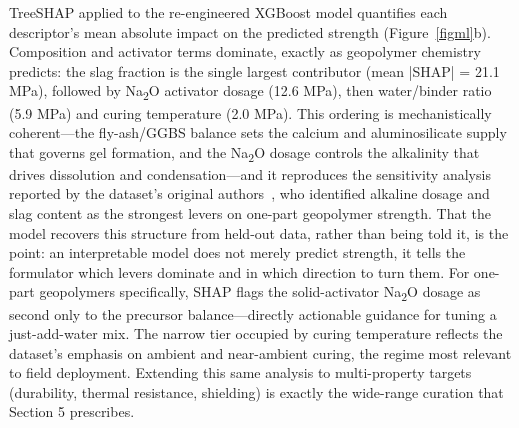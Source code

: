 \documentclass[materials,article,submit,pdftex,moreauthors]{Definitions/mdpi}
\begin{document}
TreeSHAP applied to the re-engineered XGBoost model quantifies each descriptor's mean absolute impact on the predicted strength (Figure~\ref{figml}b). Composition and activator terms dominate, exactly as geopolymer chemistry predicts: the slag fraction is the single largest contributor (mean |SHAP| = 21.1 MPa), followed by Na\textsubscript{2}O activator dosage (12.6 MPa), then water/binder ratio (5.9 MPa) and curing temperature (2.0 MPa). This ordering is mechanistically coherent---the fly-ash/GGBS balance sets the calcium and aluminosilicate supply that governs gel formation, and the Na\textsubscript{2}O dosage controls the alkalinity that drives dissolution and condensation---and it reproduces the sensitivity analysis reported by the dataset's original authors~\cite{ref27}, who identified alkaline dosage and slag content as the strongest levers on one-part geopolymer strength. That the model recovers this structure from held-out data, rather than being told it, is the point: an interpretable model does not merely predict strength, it tells the formulator which levers dominate and in which direction to turn them. For one-part geopolymers specifically, SHAP flags the solid-activator Na\textsubscript{2}O dosage as second only to the precursor balance---directly actionable guidance for tuning a just-add-water mix. The narrow tier occupied by curing temperature reflects the dataset's emphasis on ambient and near-ambient curing, the regime most relevant to field deployment. Extending this same analysis to multi-property targets (durability, thermal resistance, shielding) is exactly the wide-range curation that Section 5 prescribes.
\end{document}
